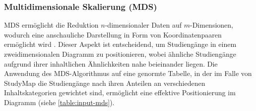 \subsubsection{Multidimensionale Skalierung (MDS)}\label{sec:MDS}
MDS ermöglicht die Reduktion $n$-dimensionaler Daten auf $m$-Dimensionen,
wodurch eine anschauliche Darstellung in Form von Koordinatenpaaren
ermöglicht wird \parencite{he_classical_2018}. Dieser Aspekt ist
entscheidend, um Studiengänge in einem zweidimensionalen Diagramm zu
positionieren, wobei ähnliche Studiengänge aufgrund ihrer inhaltlichen
Ähnlichkeiten nahe beieinander liegen. Die Anwendung des MDS-Algorithmus auf
eine genormte Tabelle, in der im Falle von StudyMap die Studiengänge nach ihren
Anteilen an verschiedenen Inhaltskategorien gewichtet sind, ermöglicht eine
effektive Positionierung im Diagramm (siehe \autoref{table:input-mds}).


